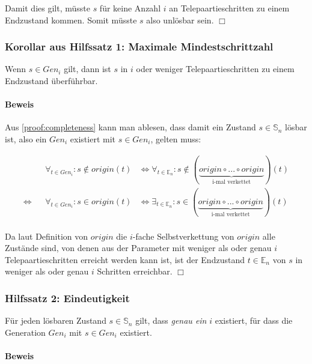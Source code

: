 \documentclass[a4paper,10pt,ngerman]{scrartcl}
\begin{document}
Damit dies gilt, müsste \(s\) für keine Anzahl \(i\) an Telepaartieschritten zu einem Endzustand kommen. Somit müsste \(s\) also unlösbar sein. \(\Box\)

\subsubsection{Korollar aus Hilfssatz 1: Maximale Mindestschrittzahl} \label{proof:maxminsteps}

Wenn \(s \in Gen_i\) gilt, dann ist \(s\) in \(i\) oder weniger Telepaartieschritten zu einem Endzustand überführbar.

\paragraph{Beweis}

Aus \cref{proof:completeness} kann man ablesen, dass damit ein Zustand \(s\in\mathbb{S}_n\) lösbar ist, also ein \(Gen_i\) existiert mit \(s \in Gen_i\), gelten muss:

\begin{align*}
    &&\forall_{t \in Gen_i} : s \notin origin(t) 
    &\iff \forall_{t \in \mathbb{E}_n} : s \notin (\underbrace{origin \circ ... \circ origin}_{\text{i-mal verkettet}})(t) \\ 
    \iff&& \forall_{t \in Gen_i} : s \in origin(t) 
    &\iff \exists_{t \in \mathbb{E}_n} : s \in (\underbrace{origin \circ ... \circ origin}_{\text{i-mal verkettet}})(t) \\ 
\end{align*}

Da laut Definition von \(origin\) die \(i\)-fache Selbstverkettung von \(origin\) alle Zustände sind, von denen aus der Parameter mit weniger als oder genau \(i\) Telepaartieschritten erreicht werden kann ist, ist der Endzustand \(t \in \mathbb{E}_n\) von \(s\) in weniger als oder genau \(i\) Schritten erreichbar. \(\Box\)

\subsubsection{Hilfssatz 2: Eindeutigkeit} \label{proof:uniqueness}

Für jeden lösbaren Zustand \(s \in \mathbb{S}_n\) gilt, dass \textit{genau ein} \(i\) existiert, für dass die Generation \(Gen_i\) mit \(s \in Gen_i\) existiert.

\paragraph{Beweis}
\end{document}
